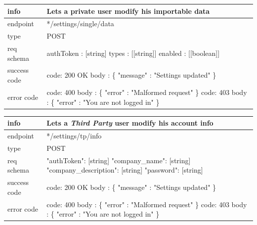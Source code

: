 \documentclass[titlepage]{article}
\begin{document}
\vspace{\baselineskip}

\begin{tabularx}{\textwidth}{lX} \hline
    info & Lets a private user modify his importable data \\ \hline
    endpoint & */settings/single/data \\ \hline
    type & POST \\ \hline
    req schema & 
        authToken : [string] \newline
        types : [[string]] \newline
        enabled : [[boolean]] \\ \hline
    success code &
        code: 200 OK \newline  
        body : \{ \newline
        "message" : "Settings updated" \newline
        \} \\ \hline
    error code &
        code: 400 \newline
        body : \{ "error" : "Malformed request" \} \newline \newline
        code: 403 \newline
        body : \{ "error" : "You are not logged in" \}\\  \hline
\end{tabularx}
		
\vspace{\baselineskip}

\begin{tabularx}{\textwidth}{lX} \hline
    info & Lets a {\it Third Party} user modify his account info \\ \hline
    endpoint & */settings/tp/info \\ \hline
    type & POST \\ \hline
    req schema & 
    "authToken": [string] \newline
    "company\_name": [string] \newline
    "company\_description": [string] \newline
    "password": [string] \\ \hline
    success code &
        code: 200 OK \newline  
        body : \{ \newline
        "message" : "Settings updated" \newline
        \} \\ \hline
    error code &
        code: 400 \newline
        body : \{ "error" : "Malformed request" \} \newline \newline
        code: 403 \newline
        body : \{ "error" : "You are not logged in" \} \\ \hline
\end{tabularx}
		
\end{document}
